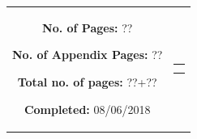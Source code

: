{\begin{tabular}{cc}
{	\begin{description}
		\item { \textbf{No. of Pages: } ?? } 
		\item { \textbf{No. of Appendix Pages: } ?? }
		\item { \textbf{Total no. of pages: } ??+?? } 
		\item { \textbf{Completed:} 08/06/2018}
	\end{description}
	\vfill } &
	\parbox{6.5cm}{
 	 \vspace{.15cm}
  	\hfill 
  	\begin{tabular}{l}
		  \bigskip \\
  		\fbox{
  		\parbox{7cm}{\bigskip
     		{\vfill{\small 
     		\bigskip}}
     	}}
   	\end{tabular}}
\end{tabular}
}